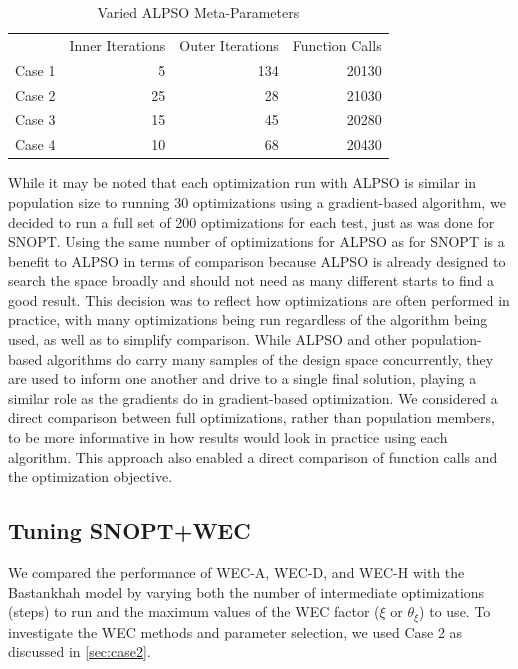 \documentclass{jpconf}
\begin{document}
\begin{table}[h!]
	\centering
	\caption{Varied ALPSO Meta-Parameters}
	\label{tab:alpsoparams}
	\begin{tabular}{lrrr}
		\toprule
		{} & Inner Iterations & Outer Iterations & Function Calls\\
		\cmidrule(lr){2-4}
		Case 1 &  5  & 134 & 20130 \\
		Case 2 & 25 & 28  & 21030 \\
		Case 3 & 15 & 45 & 20280 \\
		Case 4 & 10 & 68 & 20430 \\
		\bottomrule
	\end{tabular}
\end{table}

While it may be noted that each optimization run with ALPSO is similar in population size to running 30 optimizations using a gradient-based algorithm, we decided to run a full set of 200 optimizations for each test, just as was done for SNOPT. Using the same number of optimizations for ALPSO as for SNOPT is a benefit to ALPSO in terms of comparison because ALPSO is already designed to search the space broadly and should not need as many different starts to find a good result. This decision was to reflect how optimizations are often performed in practice, with many optimizations being run regardless of the algorithm being used, as well as to simplify comparison. While ALPSO and other population-based algorithms do carry many samples of the design space concurrently, they are used to inform one another and drive to a single final solution, playing a similar role as the gradients do in gradient-based optimization. We considered a direct comparison between full optimizations, rather than population members, to be more informative in how results would look in practice using each algorithm. This approach also enabled a direct comparison of function calls and the optimization objective.

\subsection{Tuning SNOPT+WEC}\label{sec:bpa_wec_comparison}

We compared the performance of WEC-A, WEC-D, and WEC-H with the Bastankhah  model by varying both the number of intermediate optimizations (steps) to run and the maximum values of the WEC factor ($\xi$ or $\theta_\xi$) to use. To investigate the WEC methods and parameter selection, we used Case 2 as discussed in \cref{sec:case2}. 
\end{document}
